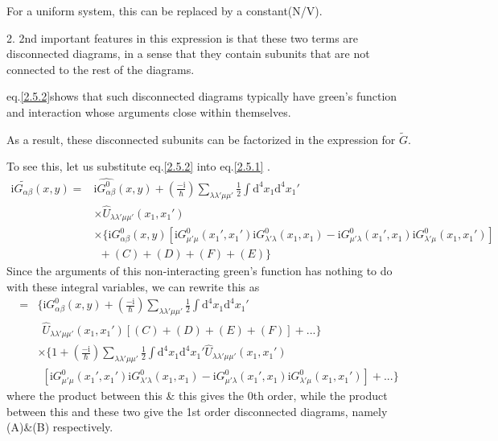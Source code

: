 For a uniform system, this can be replaced by a constant(N/V).

2. 2nd important features in this expression is that these two terms are  disconnected diagrams, in a sense that they contain subunits that are not connected to the rest of the diagrams.

eq.\eqref{2.5.2}shows that such disconnected diagrams typically have green's function and interaction whose arguments close within themselves.

As a result, these disconnected subunits can be factorized in the expression for $\tilde{G}$.

To see this, let us substitute eq.\eqref{2.5.2} into eq.\eqref{2.5.1} .
\begin{align}
\mathrm{i}\tilde{G_{\alpha\beta}}(x,y)=&\mathrm{i}\hat{G_{\alpha\beta}^0}(x,y)+(\frac{-\mathrm{i}}{\hbar})\sum_{\lambda\lambda'\mu\mu'}\frac{1}{2}\int\mathrm{d}^4x_1\mathrm{d}^4x_1' \nonumber \\
&\times \hat{U}_{\lambda\lambda'\mu\mu'}(x_1,x_1') \nonumber \\
&\times\{\mathrm{i}G_{\alpha\beta}^0(x,y)[\mathrm{i}G^0_{\mu'\mu}(x_1',x_1')\mathrm{i}G^0_{\lambda'\lambda}(x_1,x_1)-\mathrm{i}G^0_{\mu'\lambda}(x_1',x_1)\mathrm{i}G^0_{\lambda'\mu}(x_1,x_1')]\nonumber \\
&\ \ +(C)+(D)+(F)+(E)\} \nonumber
\end{align}
Since the arguments of this non-interacting green's function has nothing to do with these integral variables, we can rewrite this as
\begin{align}
=&\{\mathrm{i}G_{\alpha\beta}^0(x,y)+(\frac{-\mathrm{i}}{\hbar})\sum_{\lambda\lambda'\mu\mu'}\frac{1}{2}\int\mathrm{d}^4x_1\mathrm{d}^4x_1' \nonumber \\
&\ \ \hat{U}_{\lambda\lambda'\mu\mu'}(x_1,x_1')[(C)+(D)+(E)+(F)]+...\} \nonumber \\
&\times \{1+(\frac{-\mathrm{i}}{\hbar})\sum_{\lambda\lambda'\mu\mu'}\frac{1}{2}\int\mathrm{d}^4x_1\mathrm{d}^4x_1'\hat{U}_{\lambda\lambda'\mu\mu'}(x_1,x_1') \nonumber \\
&\ \ [\mathrm{i}G^0_{\mu'\mu}(x_1',x_1')\mathrm{i}G^0_{\lambda'\lambda}(x_1,x_1)-\mathrm{i}G^0_{\mu'\lambda}(x_1',x_1)\mathrm{i}G^0_{\lambda'\mu}(x_1,x_1')]+...\} \nonumber
\end{align}
where the product between this \& this gives the 0th order, while the product between this and these two give the 1st order disconnected diagrams, namely (A)\&(B) respectively.

